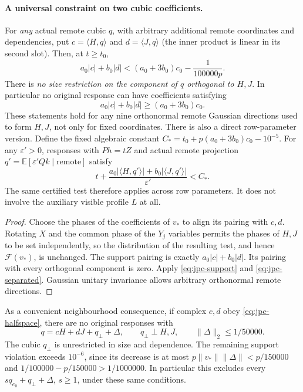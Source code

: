 \paragraph{A universal constraint on two cubic coefficients.}
For \emph{any} actual remote cubic $q$, with arbitrary additional remote
coordinates and dependencies, put $c=\langle H,q\rangle$ and
$d=\langle J,q\rangle$ (the inner product is linear in its second slot).
Then, at $t\ge t_0$,
\begin{equation}\label{eq:jpc-universal-cut}
 \boxed{\quad a_0|c|+b_0|d|
 <(a_0+3b_0)c_0-\frac1{100000p}.\quad}
\end{equation}
There is \emph{no size restriction on the component of $q$ orthogonal
to $H,J$}. In particular no original response can have coefficients
satisfying
\begin{equation}\label{eq:jpc-halfspace}
 a_0|c|+b_0|d|\ge(a_0+3b_0)c_0.
\end{equation}
These statements hold for any nine orthonormal remote Gaussian directions
used to form $H,J$, not only for fixed coordinates.
There is also a direct row-parameter version. Define the fixed algebraic
constant $C_*=t_0+p(a_0+3b_0)c_0-10^{-5}$. For any
$\varepsilon'>0$, responses with $Ph=tZ$ and actual remote projection
$q'=\mathbb E[\varepsilon'Qk\mid\text{remote}]$ satisfy
\begin{equation}\label{eq:jpc-any-row}
 t+\frac{a_0|\langle H,q'\rangle|+b_0|\langle J,q'\rangle|}
              {\varepsilon'}<C_*.
\end{equation}
The same certified test therefore applies across row parameters. It does
not involve the auxiliary visible profile $L$ at all.

\begin{proof}
Choose the phases of the coefficients of $v_*$ to align its pairing with
$c,d$. Rotating $X$ and the common phase of the $Y_j$ variables permits
the phases of $H,J$ to be set independently, so the distribution of the
resulting test, and hence $\mathcal F(v_*)$, is unchanged. The support
pairing is exactly $a_0|c|+b_0|d|$. Its pairing with every orthogonal
component is zero. Apply \eqref{eq:jpc-support} and
\eqref{eq:jpc-separated}. Gaussian unitary invariance allows arbitrary
orthonormal remote directions.
\end{proof}

As a convenient neighbourhood consequence, if complex $c,d$ obey
\eqref{eq:jpc-halfspace}, there are no original responses with
\begin{equation}\label{eq:jpc-robust}
 q=cH+dJ+q_\perp+\Delta,\qquad
 q_\perp\perp H,J,\qquad \|\Delta\|_2\le1/50000.
\end{equation}
The cubic $q_\perp$ is unrestricted in size and dependence. The remaining
support violation exceeds $10^{-6}$, since its decrease is at most
$p\|v_*\|\|\Delta\|<p/150000$ and
$1/100000-p/150000>1/1000000$.
In particular this excludes every $sq_{e_0}+q_\perp+\Delta$, $s\ge1$,
under these same conditions.

